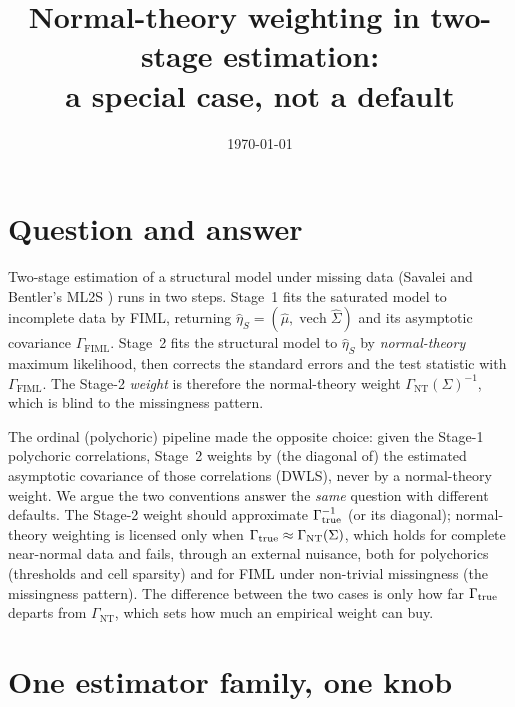 \documentclass[11pt]{article}
\title{Normal-theory weighting in two-stage estimation:\\ a special case, not a default}
\author{}
\date{\today}
\newcommand{\vech}{\operatorname{vech}}
\newcommand{\Gnt}{\Gamma_{\mathrm{NT}}}
\newcommand{\Gfiml}{\Gamma_{\mathrm{FIML}}}
\theoremstyle{plain}
\theoremstyle{remark}
\begin{document}
\maketitle

\section*{Question and answer}

Two-stage estimation of a structural model under missing data (Savalei and
Bentler's ML2S \cite{SavaleiBentler2009}) runs in two steps. Stage~1 fits the
saturated model to incomplete data by FIML, returning
$\hat\eta_S=(\hat\mu,\vech\hat\Sigma)$ and its asymptotic covariance $\Gfiml$.
Stage~2 fits the structural model to $\hat\eta_S$ by \emph{normal-theory}
maximum likelihood, then corrects the standard errors and the test statistic
with $\Gfiml$. The Stage-2 \emph{weight} is therefore the normal-theory weight
$\Gnt(\Sigma)^{-1}$, which is blind to the missingness pattern.

The ordinal (polychoric) pipeline made the opposite choice: given the Stage-1
polychoric correlations, Stage~2 weights by (the diagonal of) the estimated
asymptotic covariance of those correlations (DWLS), never by a normal-theory
weight. We argue the two conventions answer the \emph{same} question with
different defaults. The Stage-2 weight should approximate $\Gamma_{\rm
true}^{-1}$ (or its diagonal); normal-theory weighting is licensed only when
$\Gamma_{\rm true}\approx\Gnt(\Sigma)$, which holds for complete near-normal data
and fails, through an external nuisance, both for polychorics (thresholds and
cell sparsity) and for FIML under non-trivial missingness (the missingness
pattern). The difference between the two cases is only how far $\Gamma_{\rm
true}$ departs from $\Gnt$, which sets how much an empirical weight can buy.

\section{One estimator family, one knob}
\end{document}

